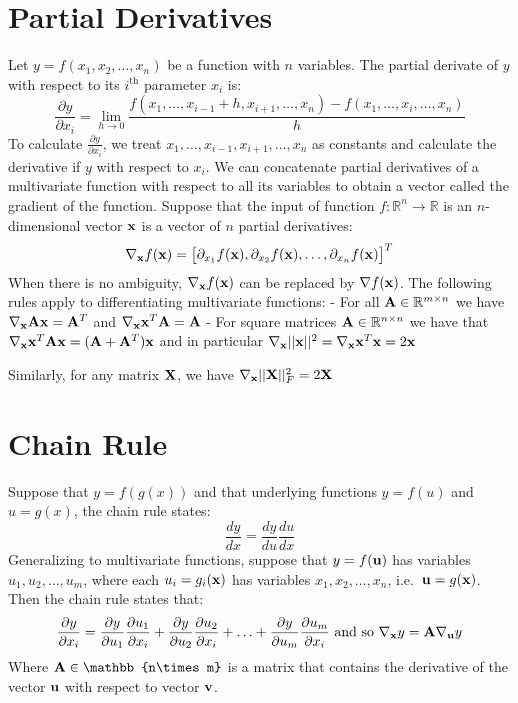 \documentclass[12pt letter]{report}
\begin{document}
\section{Partial Derivatives}\label{partial-derivatives}

Let \(y = f (x_1, x_2, \ldots, x_n)\) be a function with \(n\)
variables. The partial derivate of \(y\) with respect to its
\(i^{\text{th}}\) parameter \(x_i\) is: \[
\frac{\partial y}{\partial x_i} = \lim_{h \to 0} \frac{f(x_1, \ldots, x_{i-1} + h, x_{i + 1}, \ldots, x_n) - f(x_1, \ldots, x_i, \ldots ,x_n)}{h}
\] To calculate \(\frac{\partial y}{\partial x_i}\), we treat
\(x_1, \ldots, x_{i-1}, x_{i+1}, \ldots, x_n\) as constants and
calculate the derivative if \(y\) with respect to \(x_i\). We can
concatenate partial derivatives of a multivariate function with respect
to all its variables to obtain a vector called the gradient of the
function. Suppose that the input of function
\(f: \mathbb{R}^n \to \mathbb{R}\) is an \(n\)-dimensional vector
\(\bold{x}\) is a vector of \(n\) partial derivatives: \[
\nabla_{\bold{x}} f(\bold{x}) = \begin{bmatrix}
\partial_{x_1} f (\bold{x}),\partial_{x_2} f (\bold{x}), \ldots, \partial_{x_n} f (\bold{x})
\end{bmatrix}^{T}
\] When there is no ambiguity, \(\nabla_{\bold{x}} f(\bold{x})\) can be
replaced by \(\nabla f(\bold{x})\). The following rules apply to
differentiating multivariate functions: - For all
\(\bold{A} \in \mathbb{R}^{m \times n}\) we have
\(\nabla_{\bold{x}} \bold{A}\bold{x} = \bold{A}^T\) and
\(\nabla_{\bold{x}}\bold{x}^T\bold{A} = \bold{A}\) - For square matrices
\(\bold{A} \in \mathbb{R}^{n \times n}\) we have that
\(\nabla_{\bold{x}} \bold{x}^T \bold{A}\bold{x} = (\bold{A} + \bold{A}^T)\bold{x}\)
and in particular
\(\nabla_{\bold{x}} ||\bold{x}||^2 = \nabla_{\bold{x}} \bold{x}^T\bold{x} = 2\bold{x}\)

Similarly, for any matrix \(\bold{X}\), we have
\(\nabla_{\bold{x}} ||\bold{X}||^2_{F} = 2\bold{X}\)

\section{Chain Rule}\label{chain-rule}

Suppose that \(y = f(g(x))\) and that underlying functions \(y = f(u)\)
and \(u = g(x)\), the chain rule states: \[
\frac{dy}{dx} = \frac{dy}{du} \frac{du}{dx}
\] Generalizing to multivariate functions, suppose that
\(y = f(\bold{u})\) has variables \(u_1, u_2, \ldots, u_m\), where each
\(u_i = g_i(\bold{x})\) has variables \(x_1, x_2, \ldots, x_n\),
i.e.~\(\bold{u} = g(\bold{x})\). Then the chain rule states that: \[
\frac{\partial y}{\partial x_i} = \frac{\partial y}{\partial u_1}\frac{\partial u_1}{\partial x_i} + \frac{\partial y}{\partial u_2}\frac{\partial u_2}{\partial x_i} + \ldots + \frac{\partial y}{\partial u_m}\frac{\partial u_m}{\partial x_i} \text{ and so } \nabla_{\bold{x}}y = \bold{A}\nabla_{\bold{u}}y
\] Where \(\bold{A} \in \mathbb{n\times m}\) is a matrix that contains
the derivative of the vector \(\bold{u}\) with respect to vector
\(\bold{v}\).
\end{document}
